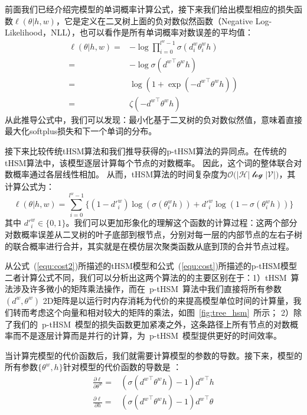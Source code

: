 前面我们已经介绍完模型的单词概率计算公式，接下来我们给出模型相应的损失函数$ \ell(\theta | h,w)$，它是定义在二叉树上面的负对数似然函数（Negative Log-Likelihood，NLL），也可以看作是所有单词概率对数误差的平均值：
\begin{equation}\label{equ:cost}
\begin{split}
   \ell(\theta|h,w) =&-\log\prod_{i=0}^{l^w -1} \sigma(d_i^w \theta_{i}^w h) \\
   =& -\log \sigma({d^w}^\top \theta^w h)\\
    =& \log (1+\exp(- {d^w}^\top \theta^w h )) \\
    =&  \zeta(- {d^w}^\top \theta^w h )
\end{split}
\end{equation}
从此推导公式中，我们可以发现：最小化基于二叉树的负对数似然值，意味着直接最大化softplus损失和下一个单词的分布。

接下来比较传统tHSM算法和我们推导获得的p-tHSM算法的异同点。在传统的tHSM算法中，该模型逐层计算每个节点的对数概率。 因此，这个词的整体联合对数概率通过各层线性相加。 从而，tHSM算法的时间复杂度为$\mathcal{O(|H|\log|V|})$，其计算公式为：
\begin{equation}\label{equ:cost2}
\ell(\theta|h,w) =\sum_{i=0}^{l^w-1} \{(1-d'^w_i)\log (\sigma(\theta_{i}^w h))  + {d'^w_i}\log (1-\sigma (\theta_{i}^w h))\}
\end{equation}
其中 $d'^w_i\in \{0,1\}$。我们可以更加形象化的理解这个函数的计算过程：这两个部分对数概率误差从二叉树的叶子底部到根节点，分别对每一层的内部节点的左右子树的联合概率进行合并，其实就是在模仿层次聚类函数从底到顶的合并节点过程。

从公式~(\ref{equ:cost2})所描述的tHSM模型和公式~(\ref{equ:cost})所描述的p-tHSM模型二者计算公式不同，我们可以分析出这两个算法的的主要区别在于：1）tHSM~算法涉及许多微小的矩阵乘法操作，而在~p-tHSM~算法中我们直接将所有参数$(d^w,\theta^w)$ 2D矩阵是以运行时内存消耗为代价的来提高模型单位时间的计算量，我们转而考虑这个向量和相对较大的矩阵的乘法，如图~\ref{fig:tree_hsm}~所示； 2）除了我们的~p-tHSM~模型的损失函数更加紧凑之外，这条路径上所有节点的对数概率而不是逐层计算而是并行的计算，为~p-tHSM~模型提供更好的时间效率。

当计算完模型的代价函数后，我们就需要计算模型的参数的导数。接下来，模型的所有参数$\{\theta^w,h\}$针对模型的代价函数的导数是 ：
\begin{equation}
\begin{split}
\frac{\partial \ell}{\partial \theta^w}=&(\sigma({d^w}^\top\theta^w h) -1){d^w}^\top h \\
\frac{\partial \ell}{\partial h}=&(\sigma({d^w}^\top \theta^w h) -1){d^w}^\top \theta
\end{split}
\end{equation}


